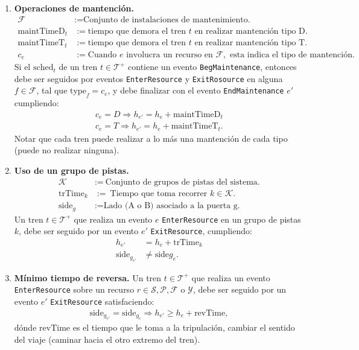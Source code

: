\documentclass[letter, 10pt]{article}
\begin{document}
\begin{description}
\begin{enumerate}
        \item \textbf{Operaciones de mantención.}
        \begin{align*}
            \mathcal{F} &:= \text{Conjunto de instalaciones de mantenimiento.} \\
            \text{maintTimeD}_t &:= \text{tiempo que demora el tren } t \text{ en realizar mantención tipo D.} \\
            \text{maintTimeT}_t &:= \text{tiempo que demora el tren } t \text{ en realizar mantención tipo T.} \\
            c_e &:= \text{Cuando } e \text{ involucra un recurso en } \mathcal{F}, \text{ esta indica el tipo de mantención.}
        \end{align*}
        Si el $\text{sched}_t$ de un tren $t \in \mathcal{T}^+$ contiene un evento \texttt{BegMaintenance}, entonces debe ser seguidos por eventos \texttt{EnterResource} y \texttt{ExitRosource} en alguna $f \in \mathcal{F}$,  tal que $\text{type}_f = c_e$, y debe finalizar con el evento \texttt{EndMaintenance} $e'$ cumpliendo:
        \begin{align*}
            c_e = D \Rightarrow h_{e'} = h_e + \text{maintTimeD}_t \\
            c_e = T \Rightarrow h_{e'} = h_e + \text{maintTimeT}_t.
        \end{align*}
        Notar que cada tren puede realizar a lo más una mantención de cada tipo (puede no realizar ninguna).
        \item \textbf{Uso de un grupo de pistas.}
        \begin{align*}
            \mathcal{K} &:= \ \text{Conjunto de grupos de pistas del sistema.} \\
            \text{trTime}_k &:= \ \text{Tiempo que toma recorrer } k \in \mathcal{K}. \\
            \text{side}_g &:= \text{Lado (A o B) asociado a la puerta g.}
        \end{align*}
        Un tren $t \in \mathcal{T}^+$ que realiza un evento $e$ \texttt{EnterResource} en un grupo de pistas $k$, debe ser seguido por un evento $e'$ \texttt{ExitResource}, cumpliendo:
        \begin{align*}
            h_{e'} &= h_e + \text{trTime}_k \\
            \text{side}_{g_{e'}} &\neq \text{side}{g_{e}}.
        \end{align*}
        \item \textbf{Mínimo tiempo de reversa.} Un tren $t \in \mathcal{T}^+$ que realiza un evento \texttt{EnterResource} sobre un recurso $r \in \mathcal{S}, \mathcal{P}, \mathcal{F} \text{ o } \mathcal{Y}$, debe ser seguido por un evento $e'$ \texttt{ExitResource} satisfaciendo:
        \begin{align*}
             \text{side}_{g_{e'}} = \text{side}_{g_e} \Rightarrow h_{e'} \geq h_e + \text{revTime},
          \end{align*}
          dónde $\text{revTime}$ es el tiempo que le toma a la tripulación, cambiar el sentido del viaje (caminar hacia el otro extremo del tren).
    \end{enumerate}


\end{description}
\end{document}
